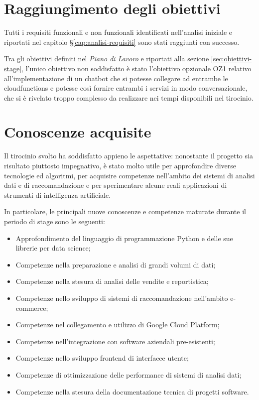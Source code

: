 \section{Raggiungimento degli obiettivi}

Tutti i requisiti funzionali e non funzionali identificati nell'analisi iniziale e riportati nel capitolo \S\ref{cap:analisi-requisiti} sono stati raggiunti con successo.

Tra gli obiettivi definiti nel \emph{Piano di Lavoro} e riportati alla sezione \ref{sec:obiettivi-stage}, l'unico obiettivo non soddisfatto è stato l'obiettivo opzionale OZ1 relativo all'implementazione di un chatbot che si potesse collegare ad entrambe le \gls{cloudfunctions} e potesse così fornire entrambi i servizi in modo conversazionale, che si è rivelato troppo complesso da realizzare nei tempi disponibili nel tirocinio.


\section{Conoscenze acquisite}

Il tirocinio svolto ha soddisfatto appieno le aspettative: nonostante il progetto sia risultato piuttosto impegnativo, è stato molto utile per approfondire diverse tecnologie ed algoritmi, per acquisire competenze nell’ambito dei sistemi di analisi dati e di raccomandazione e per sperimentare alcune reali applicazioni di strumenti di intelligenza artificiale.

In particolare, le principali nuove conoscenze e competenze maturate durante il
periodo di stage sono le seguenti:

\begin{itemize}
    \item Approfondimento del linguaggio di programmazione Python e delle sue librerie per data science;
    \item Competenze nella preparazione e analisi di grandi volumi di dati;
    \item Competenze nella stesura di analisi delle vendite e reportistica;
    \item Competenze nello sviluppo di sistemi di raccomandazione nell'ambito e-commerce;
    \item Competenze nel collegamento e utilizzo di Google Cloud Platform;
    \item Competenze nell'integrazione con software aziendali pre-esistenti;
    \item Competenze nello sviluppo frontend di interfacce utente;
    \item Competenze di ottimizzazione delle performance di sistemi di analisi dati;
    \item Competenze nella stesura della documentazione tecnica di progetti software.
\end{itemize}


